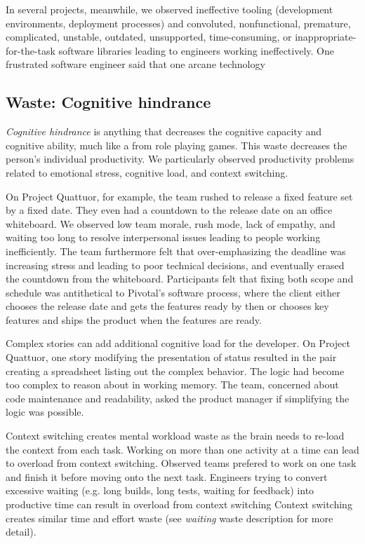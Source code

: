 In several projects, meanwhile, we observed ineffective tooling (development environments, deployment processes) and convoluted, nonfunctional, premature, complicated, unstable, outdated, unsupported, time-consuming, or inappropriate-for-the-task software libraries leading to engineers working ineffectively. One frustrated software engineer said that one arcane technology 
\subsection{Waste: Cognitive hindrance}
\textit{Cognitive hindrance} is anything that decreases the cognitive capacity and cognitive ability, much like a  from role playing games. This waste decreases the person's individual productivity. We particularly observed productivity problems related to emotional stress, cognitive load, and context switching.


On Project Quattuor, for example, the team rushed to release a fixed feature set by a fixed date. They even had a countdown to the release date on an office whiteboard. We observed low team morale, rush mode, lack of empathy, and waiting too long to resolve interpersonal issues leading to people working inefficiently. The team furthermore felt that over-emphasizing the deadline was increasing stress and leading to poor technical decisions, and eventually erased the countdown from the whiteboard. Participants felt that fixing both scope and schedule was antithetical to Pivotal's software process, where the client either chooses the release date and gets the features ready by then or chooses key features and ships the product when the features are ready. 


Complex stories can add additional cognitive load for the developer. On Project Quattuor, one story modifying the presentation of status resulted in the pair creating a spreadsheet listing out the complex behavior. The logic had become too complex to reason about in working memory. The team, concerned about code maintenance and readability, asked the product manager if simplifying the logic was possible. 


Context switching creates mental workload waste as the brain needs to re-load the context from each task. Working on more than one activity at a time can lead to overload from context switching. Observed teams prefered to work on one task and finish it before moving onto the next task. Engineers trying to convert excessive waiting (e.g. long builds, long tests, waiting for feedback) into productive time can result in overload from context switching 
Context switching creates similar time and effort waste (see \textit{waiting} waste description for more detail).
